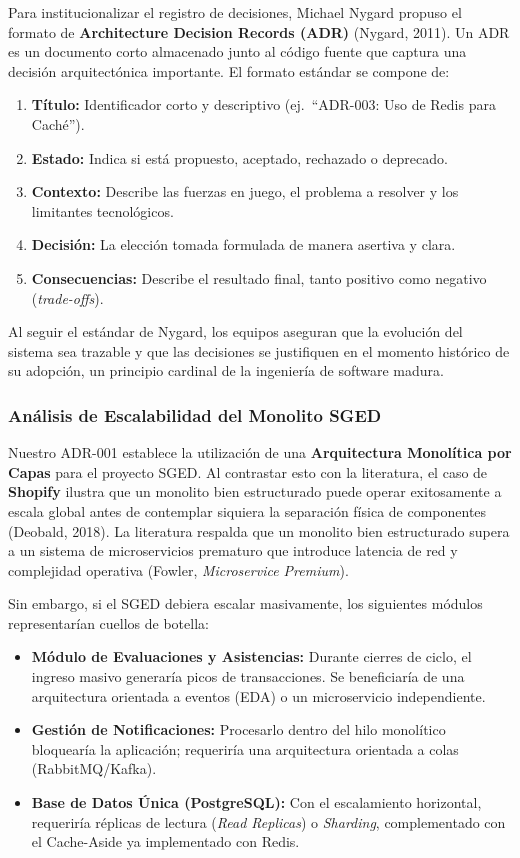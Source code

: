 \documentclass[12pt]{article}
\begin{document}
	Para institucionalizar el registro de decisiones, Michael Nygard propuso el formato de \textbf{Architecture Decision Records (ADR)} (Nygard, 2011). Un ADR es un documento corto almacenado junto al código fuente que captura una decisión arquitectónica importante. El formato estándar se compone de:
	
	\begin{enumerate}
		\item \textbf{Título:} Identificador corto y descriptivo (ej.\ ``ADR-003: Uso de Redis para Caché'').
		\item \textbf{Estado:} Indica si está propuesto, aceptado, rechazado o deprecado.
		\item \textbf{Contexto:} Describe las fuerzas en juego, el problema a resolver y los limitantes tecnológicos.
		\item \textbf{Decisión:} La elección tomada formulada de manera asertiva y clara.
		\item \textbf{Consecuencias:} Describe el resultado final, tanto positivo como negativo (\textit{trade-offs}).
	\end{enumerate}
	
	Al seguir el estándar de Nygard, los equipos aseguran que la evolución del sistema sea trazable y que las decisiones se justifiquen en el momento histórico de su adopción, un principio cardinal de la ingeniería de software madura.
	
	\subsubsection*{Análisis de Escalabilidad del Monolito SGED}
	
	Nuestro ADR-001 establece la utilización de una \textbf{Arquitectura Monolítica por Capas} para el proyecto SGED. Al contrastar esto con la literatura, el caso de \textbf{Shopify} ilustra que un monolito bien estructurado puede operar exitosamente a escala global antes de contemplar siquiera la separación física de componentes (Deobald, 2018). La literatura respalda que un monolito bien estructurado supera a un sistema de microservicios prematuro que introduce latencia de red y complejidad operativa (Fowler, \textit{Microservice Premium}).
	
	Sin embargo, si el SGED debiera escalar masivamente, los siguientes módulos representarían cuellos de botella:
	
	\begin{itemize}
		\item \textbf{Módulo de Evaluaciones y Asistencias:} Durante cierres de ciclo, el ingreso masivo generaría picos de transacciones. Se beneficiaría de una arquitectura orientada a eventos (EDA) o un microservicio independiente.
		\item \textbf{Gestión de Notificaciones:} Procesarlo dentro del hilo monolítico bloquearía la aplicación; requeriría una arquitectura orientada a colas (RabbitMQ/Kafka).
		\item \textbf{Base de Datos Única (PostgreSQL):} Con el escalamiento horizontal, requeriría réplicas de lectura (\textit{Read Replicas}) o \textit{Sharding}, complementado con el Cache-Aside ya implementado con Redis.
	\end{itemize}
	
\end{document}
